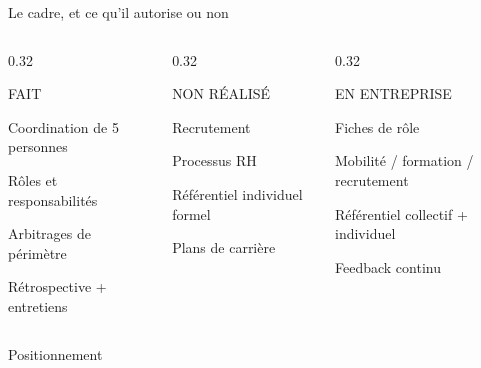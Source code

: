 \begin{frame}{Le cadre, et ce qu'il autorise ou non}
\begin{columns}[T]
\begin{column}{0.32\linewidth}
\begin{block}{FAIT}
\small
\begin{tightitems}
  \item Coordination de 5 personnes
  \item Rôles et responsabilités
  \item Arbitrages de périmètre
  \item Rétrospective + entretiens
\end{tightitems}
\end{block}
\end{column}
\begin{column}{0.32\linewidth}
\begin{block}{NON RÉALISÉ}
\small
\begin{tightitems}
  \item Recrutement
  \item Processus RH
  \item Référentiel individuel formel
  \item Plans de carrière
\end{tightitems}
\end{block}
\end{column}
\begin{column}{0.32\linewidth}
\begin{block}{EN ENTREPRISE}
\small
\begin{tightitems}
  \item Fiches de rôle
  \item Mobilité / formation / recrutement
  \item Référentiel collectif + individuel
  \item Feedback continu
\end{tightitems}
\end{block}
\end{column}
\end{columns}
\vspace{0.5em}
\begin{block}{Positionnement}
\centering\small {}
\end{block}
\end{frame}

